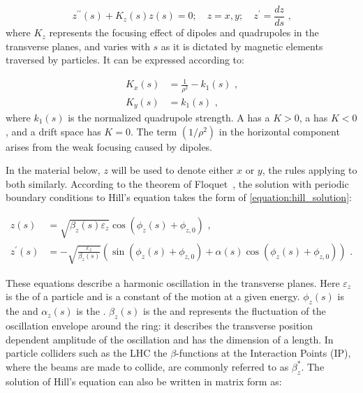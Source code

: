 \begin{equation}
    z^{\prime \prime}(s) + K_z(s) z(s) = 0; \quad z = x, y; \quad z^{\prime} = \dfrac{dz}{ds} \text{ ,}
    \label{equation:hill_equation}
\end{equation}
where \(K_z\) represents the focusing effect of dipoles and quadrupoles in the transverse planes, and varies with \(s\) as it is dictated by magnetic elements traversed by particles.
It can be expressed according to:

\begin{equation}
	\begin{aligned}
		K_x(s) &= \frac{1}{\rho^2} - k_1(s) \text{ ,} \\
    	K_y(s) &= k_1(s) \text{ ,}
	\end{aligned}
    \label{equation:transverse_focusing_strengths}
\end{equation}
where \(k_1(s)\) is the normalized quadrupole strength.
A  has a \(K > 0\), a  has \(K < 0\), and a drift space has \(K = 0\).
The term \(\left(1 / \rho^2\right)\) in the horizontal component arises from the weak focusing caused by dipoles.

In the material below, \(z\) will be used to denote either \(x\) or \(y\), the rules applying to both similarly.
According to the theorem of Floquet~\cite{BOOK:Lee:Accelerator_physics}, the solution with periodic boundary conditions to Hill’s equation takes the form of \cref{equation:hill_solution}:

\begin{equation}
    \begin{aligned}
        z(s)          &= \sqrt{\beta_{z}(s) \varepsilon_{z}} \cos \left( \phi_{z}(s) + \phi_{z,0} \right) \text{ ,} \\
        z^{\prime}(s) &= -\sqrt{\frac{\varepsilon_z}{\beta_z(s)}} \left( \sin \left(\phi_z(s) + \phi_{z, 0} \right) + \alpha(s) \cos \left( \phi_z(s) + \phi_{z, 0} \right) \right) \text{ .}
    \end{aligned}
    \label{equation:hill_solution}
\end{equation}

These equations describe a harmonic oscillation in the transverse planes.
Here \(\varepsilon_z\) is the  of a particle and is a constant of the motion at a given energy. 
\(\phi_z(s)\) is the  and \(\alpha_z(s)\) is the .
\(\beta_z(s)\) is the  and represents the fluctuation of the oscillation envelope around the ring: it describes the transverse position dependent amplitude of the oscillation and has the dimension of a length.
In particle colliders such as the LHC the \(\beta\)-functions at the Interaction Points (IP), where the beams are made to collide, are commonly referred to as \(\beta_z^{\ast}\).
The solution of Hill's equation can also be written in matrix form as:

